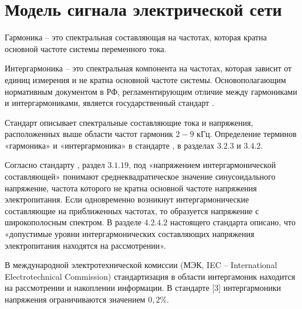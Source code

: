 


\section{Модель сигнала электрической сети} \label{sec:ch1/sec6}

Гармоника -- это спектральная составляющая на частотах, которая кратна основной частоте системы переменного тока. 

Интергармоника -- это спектральная компонента на частотах, которая зависит от единиц измерения и не кратна основной частоте системы.
Основополагающим нормативным документом в РФ, регламентирующим отличие между гармониками и интергармониками, является государственный стандарт \cite{GOST30804.4.7-2013}. 

Стандарт  описывает спектральные составляющие тока и напряжения, расположенных выше области частот гармоник $2-9$ кГц. Определение терминов «гармоника» и «интергармоника» в стандарте \cite{GOST30804.4.7-2013}, в разделах $3.2.3$ и $3.4.2$.

Согласно стандарту \cite{GOST32144-2013}, раздел $3.1.19$, под «напряжением интергармонической составляющей» понимают среднеквадратическое значение синусоидального напряжение, частота которого не кратна основной частоте напряжения электропитания.
Если одновременно возникнут интергармонические составляющие на приближенных частотах, то образуется напряжение с широкополосным спектром. В разделе $4.2.4.2$ настоящего стандарта описано, что «допустимые уровни интергармонических составляющих напряжения электропитания находятся на рассмотрении».

В международной электротехнической комиссии (МЭК, IEC -- International Electrotechnical Commission) стандартизация в области интергамоник находится на рассмотрении и накоплении информации. В стандарте [3] интергармоники напряжения ограничиваются значением $0,2\%$.

